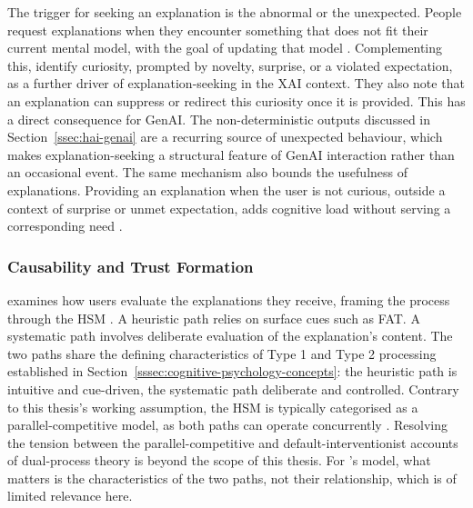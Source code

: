 The trigger for seeking an explanation is the abnormal or the unexpected. People request explanations when they encounter something that does not fit their current mental model, with the goal of updating that model \parencite{Lombrozo2006, Hilton1986}. Complementing this, \textcite{Hoffman2023} identify curiosity, prompted by novelty, surprise, or a violated expectation, as a further driver of explanation-seeking in the \ac{XAI} context. They also note that an explanation can suppress or redirect this curiosity once it is provided. This has a direct consequence for \ac{GenAI}. The non-deterministic outputs discussed in Section~\ref{ssec:hai-genai} are a recurring source of unexpected behaviour, which makes explanation-seeking a structural feature of \ac{GenAI} interaction rather than an occasional event. The same mechanism also bounds the usefulness of explanations. Providing an explanation when the user is not curious, outside a context of surprise or unmet expectation, adds cognitive load without serving a corresponding need \parencite{Miller2019}.

\subsubsection*{Causability and Trust Formation}

\textcite{Shin2021} examines how users evaluate the explanations they receive, framing the process through the \ac{HSM} \parencite{Chaiken1980}. A heuristic path relies on surface cues such as \ac{FAT}. A systematic path involves deliberate evaluation of the explanation's content. The two paths share the defining characteristics of Type 1 and Type 2 processing established in Section~\ref{sssec:cognitive-psychology-concepts}: the heuristic path is intuitive and cue-driven, the systematic path deliberate and controlled. Contrary to this thesis's working assumption, the \ac{HSM} is typically categorised as a parallel-competitive model, as both paths can operate concurrently \parencite{Chaiken1980}. Resolving the tension between the parallel-competitive and default-interventionist accounts of dual-process theory is beyond the scope of this thesis. For \textcite{Shin2021}'s model, what matters is the characteristics of the two paths, not their relationship, which is of limited relevance here.


